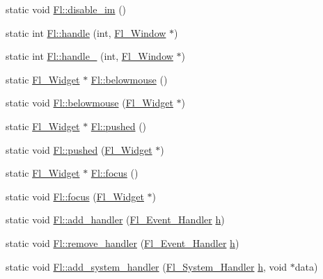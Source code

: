 \begin{DoxyCompactItemize}
\item 
static void \hyperlink{group__fl__events_ga792ec093c9ef58930ac0657152bee665}{Fl\+::disable\+\_\+im} ()
\item 
static int \hyperlink{group__fl__events_ga62aea907b7eb34f14adbb8c92b2df221}{Fl\+::handle} (int, \hyperlink{class_fl___window}{Fl\+\_\+\+Window} $\ast$)
\item 
static int \hyperlink{group__fl__events_ga0527dc884bbea7cb3ef1d7e1d0c50b71}{Fl\+::handle\+\_\+} (int, \hyperlink{class_fl___window}{Fl\+\_\+\+Window} $\ast$)
\item 
static \hyperlink{class_fl___widget}{Fl\+\_\+\+Widget} $\ast$ \hyperlink{group__fl__events_ga5b55ce634002a2743c24c4c4db7cbdd4}{Fl\+::belowmouse} ()
\item 
static void \hyperlink{group__fl__events_gab66b64b6ae4d8229f01fa88fa7c9090e}{Fl\+::belowmouse} (\hyperlink{class_fl___widget}{Fl\+\_\+\+Widget} $\ast$)
\item 
static \hyperlink{class_fl___widget}{Fl\+\_\+\+Widget} $\ast$ \hyperlink{group__fl__events_gadcd24382935bf08b56b1532dfe80da25}{Fl\+::pushed} ()
\item 
static void \hyperlink{group__fl__events_ga6354e26494fadf24cbeadb61af57ffe1}{Fl\+::pushed} (\hyperlink{class_fl___widget}{Fl\+\_\+\+Widget} $\ast$)
\item 
static \hyperlink{class_fl___widget}{Fl\+\_\+\+Widget} $\ast$ \hyperlink{group__fl__events_ga7f0e9836db43268979e0b3a999583b7f}{Fl\+::focus} ()
\item 
static void \hyperlink{group__fl__events_ga1b3d0faad436e706677d9d9d2ba2baf8}{Fl\+::focus} (\hyperlink{class_fl___widget}{Fl\+\_\+\+Widget} $\ast$)
\item 
static void \hyperlink{group__fl__events_ga04759d795ad0df6d5ee19e82aa92b3ec}{Fl\+::add\+\_\+handler} (\hyperlink{group__callback__functions_ga188f6b1dd8e78ccc91c013fe5c6bba74}{Fl\+\_\+\+Event\+\_\+\+Handler} \hyperlink{group__fl__screen_ga0a9410a98136445bacce42b2e3ad4e84}{h})
\item 
static void \hyperlink{group__fl__events_ga1e4ab0d2521ad7b51a03378d4e09e476}{Fl\+::remove\+\_\+handler} (\hyperlink{group__callback__functions_ga188f6b1dd8e78ccc91c013fe5c6bba74}{Fl\+\_\+\+Event\+\_\+\+Handler} \hyperlink{group__fl__screen_ga0a9410a98136445bacce42b2e3ad4e84}{h})
\item 
static void \hyperlink{group__fl__events_ga49d612bb8375ea7b7447d7e483e771ff}{Fl\+::add\+\_\+system\+\_\+handler} (\hyperlink{group__callback__functions_ga0cd86d9a18073304779213e82747ac8a}{Fl\+\_\+\+System\+\_\+\+Handler} \hyperlink{group__fl__screen_ga0a9410a98136445bacce42b2e3ad4e84}{h}, void $\ast$data)

\end{DoxyCompactItemize}
